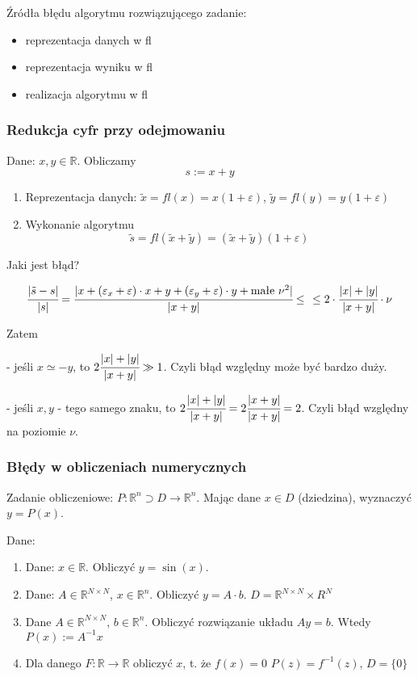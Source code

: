 \documentclass[hidelinks,a4paper,fleqn]{article}
\newcommand{\RR}{\mathbb{R}}
\newcommand{\ra}{\rightarrow}
\begin{document}
Źródła błędu algorytmu rozwiązującego zadanie:
\begin{itemize}
	\item reprezentacja danych w fl
	\item reprezentacja wyniku w fl
	\item realizacja algorytmu w fl
\end{itemize}


\subsubsection{Redukcja cyfr przy odejmowaniu}

Dane: $x, y \in \RR$. Obliczamy
\[
	s := x + y
\]

\begin{enumerate}
	\item Reprezentacja danych: $\tilde{x} = fl(x) = x(1+\varepsilon)$,
	      $\tilde{y} = fl(y) = y(1 + \varepsilon)$
	\item Wykonanie algorytmu
	      \[
	      	\tilde{s} = fl(\tilde{x} + \tilde{y}) = (\tilde{x} + \tilde{y})(1 + \varepsilon)
	      \]
\end{enumerate}

Jaki jest błąd?

\[
	\cfrac{|\tilde{s} - s|}{|s|} = \cfrac{|x + (\varepsilon_x + \varepsilon)\cdot x + y + (\varepsilon_y + \varepsilon)\cdot y + \textrm{małe }\nu^2|}{|x + y|} \leq \cfrac{}{} \leq 2 \cdot \cfrac{|x|+|y|}{|x+y|} \cdot \nu
\]

Zatem

- jeśli $x \simeq -y$, to $2\cfrac{|x|+|y|}{|x+y|} \gg 1$. Czyli błąd względny może być bardzo duży.

- jeśli $x, y$ - tego samego znaku, to $2 \cfrac{|x|+|y|}{|x+y|} = 2 \cfrac{|x+y|}{|x+y|} = 2$. Czyli błąd względny na poziomie $\nu$.

\subsubsection{Błędy w obliczeniach numerycznych}

Zadanie obliczeniowe: $P: \RR^n \supset D \ra \RR^n$. Mając dane $x \in D$ (dziedzina), wyznaczyć $y = P(x)$.

Dane:

\begin{enumerate}
	\item Dane: $x \in \RR$. Obliczyć $y=\sin(x)$.
	\item Dane: $A \in \RR^{N \times N}$, $x \in \RR^n$. Obliczyć $y = A \cdot b$.
	      $D = \RR^{N \times N} \times R^N$
	\item Dane $A \in \RR^{N \times N}$, $b \in \RR^n$. Obliczyć rozwiązanie układu $Ay = b$. Wtedy $P(x) := A^{-1}x$
	\item Dla danego $F: \RR \ra \RR$ obliczyć $x$, t. że $f(x) = 0$
	      $P(z) = f^{-1}(z)$, $D = \{0\}$
\end{enumerate}
\end{document}
